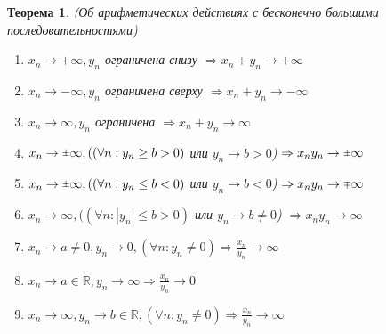 \documentclass[12pt, a4]{article}
\newtheorem*{theorem}{Теорема}
\renewcommand{\implies}{\Rightarrow}
\newcommand{\rpm}{\raisebox{.2ex}{$\scriptstyle\pm$}}
\newcommand{\rmp}{\raisebox{.2ex}{$\scriptstyle\mp$}}
\newcommand{\R}{\mathbb{R}}
\begin{document}
\begin{theorem}(Об арифметических действиях с бесконечно большими последовательностями)
\begin{enumerate}
    \item $x_n \to +\infty, {y_n}$ ограничена снизу $\implies x_n + y_n \to +\infty $
    \item $x_n \to -\infty, {y_n}$ ограничена сверху $\implies x_n + y_n \to -\infty $
    \item $x_n \to \infty, {y_n}$ ограничена $\implies x_n + y_n \to \infty $
    \item $x_n \to \rpm\infty, ((\forall n: y_n \geq b > 0)$ или $y_n \to b > 0$) $\implies x_n y_n \to \rpm\infty$
    \item $x_n \to \rpm\infty, ((\forall n: y_n \leq b < 0)$ или $y_n \to b < 0$) $\implies x_n y_n \to \rmp\infty$
    \item $x_n \to \infty, ((\forall n: |y_n| \leq b > 0)$ или $y_n \to b \neq 0$) $\implies x_n y_n \to \infty$
    \item $x_n \to a \neq 0, y_n \to 0, (\forall n: y_n \neq 0) \implies \frac{x_n}{y_n} \to \infty$
    \item $x_n \to a \in \R, y_n \to \infty \implies \frac{x_n}{y_n} \to 0$
    \item $x_n \to \infty, y_n \to b \in \R, (\forall n: y_n \neq 0) \implies \frac{x_n}{y_n} \to \infty$
\end{enumerate}
\end{theorem}
\end{document}

